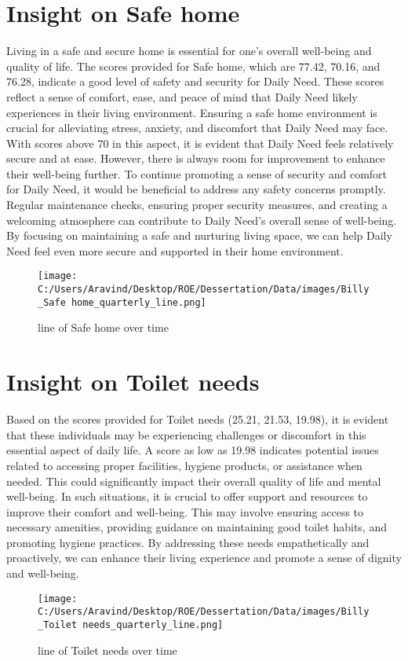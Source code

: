 \documentclass[10pt, a4paper]{article}%
\begin{document}
\section{Insight on Safe home}%
\label{sec:InsightonSafehome}%
Living in a safe and secure home is essential for one's overall well{-}being and quality of life. The scores provided for Safe home, which are 77.42, 70.16, and 76.28, indicate a good level of safety and security for Daily Need. These scores reflect a sense of comfort, ease, and peace of mind that Daily Need likely experiences in their living environment.\newline%
\newline%
Ensuring a safe home environment is crucial for alleviating stress, anxiety, and discomfort that Daily Need may face. With scores above 70 in this aspect, it is evident that Daily Need feels relatively secure and at ease. However, there is always room for improvement to enhance their well{-}being further.\newline%
\newline%
To continue promoting a sense of security and comfort for Daily Need, it would be beneficial to address any safety concerns promptly. Regular maintenance checks, ensuring proper security measures, and creating a welcoming atmosphere can contribute to Daily Need's overall sense of well{-}being. By focusing on maintaining a safe and nurturing living space, we can help Daily Need feel even more secure and supported in their home environment.%
\begin{figure}[H]%
\centering%
\texttt{[image: C:/Users/Aravind/Desktop/ROE/Dessertation/Data/images/Billy\_Safe home\_quarterly\_line.png]}%
\caption{line of Safe home over time}%
\end{figure}

%
\section{Insight on Toilet needs}%
\label{sec:InsightonToiletneeds}%
Based on the scores provided for Toilet needs (25.21, 21.53, 19.98), it is evident that these individuals may be experiencing challenges or discomfort in this essential aspect of daily life. A score as low as 19.98 indicates potential issues related to accessing proper facilities, hygiene products, or assistance when needed. This could significantly impact their overall quality of life and mental well{-}being.\newline%
\newline%
In such situations, it is crucial to offer support and resources to improve their comfort and well{-}being. This may involve ensuring access to necessary amenities, providing guidance on maintaining good toilet habits, and promoting hygiene practices. By addressing these needs empathetically and proactively, we can enhance their living experience and promote a sense of dignity and well{-}being.%
\begin{figure}[H]%
\centering%
\texttt{[image: C:/Users/Aravind/Desktop/ROE/Dessertation/Data/images/Billy\_Toilet needs\_quarterly\_line.png]}%
\caption{line of Toilet needs over time}%
\end{figure}

%
\end{document}
